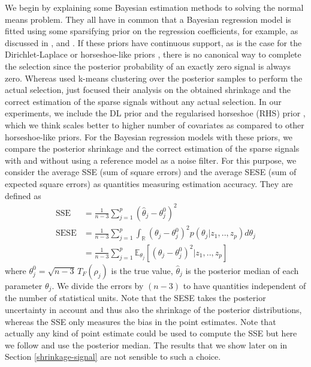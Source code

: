 \documentclass[american,]{article}
\theoremstyle{definition}
\begin{document}
We begin by explaining some Bayesian estimation methods to solving the normal means problem. They all have in common that a Bayesian regression model is fitted using some sparsifying prior on the regression coefficients, for example, as discussed in \cite{paper:dirichlet_laplace}, \cite{bhadra2017horseshoe+} and \cite{johnstone2004needles}. If these priors have continuous support, as is the case for the Dirichlet-Laplace \cite[DL;][]{paper:dirichlet_laplace} or horseshoe-like priors \citep{paper:hs,bhadra2017horseshoe+,paper:rhs}, there is no canonical way to complete the selection since the posterior probability of an exactly zero signal is always zero. Whereas \cite{paper:dirichlet_laplace} used k-means clustering over the posterior samples to perform the actual selection, \cite{bhadra2017horseshoe+} just focused their analysis on the obtained shrinkage and the correct estimation of the sparse signals without any actual selection. In our experiments, we include the DL prior and the regularised horseshoe (RHS) prior \citep{paper:rhs}, which we think scales better to higher number of covariates as compared to other horseshoe-like priors. For the Bayesian regression models with these priors, we compare the posterior shrinkage and the correct estimation of the sparse signals with and without using a reference model as a noise filter. For this purpose, we consider the   average SSE (sum of square errors) and the average SESE (sum of expected square errors) as quantities measuring estimation accuracy. They are defined as
\
\begin{align}
\text{SSE}&=\frac{1}{n-3}\sum_{j=1}^{p}(\hat{\theta}_{j} - \theta^{0}_{j})^{2} \label{eq:SSE} \\
\text{SESE}&=\frac{1}{n-3}\sum_{j=1}^{p}\int_{\mathbb{R}}(\theta_{j}-\theta^{0}_{j})^{2}p(\theta_{j}|z_{1},..,z_{p})d\theta_{j} \\
&=\frac{1}{n-3}\sum_{j=1}^{p}\mathbb{E}_{\theta_{j}}[(\theta_{j}-\theta^{0}_{j})^{2}|z_{1},..,z_{p}] \label{eq:SESE}
\end{align}
where $\theta_{j}^{0}=\sqrt{n-3}\,T_{F}(\rho_{j})$ is the true value, $\hat{\theta}_{j}$ is the posterior median of each parameter $\theta_{j}$. We divide the errors by $(n-3)$ to have quantities independent of the number of statistical units. Note that the SESE takes the posterior uncertainty in account and thus also the shrinkage of the posterior distributions, whereas the SSE only measures the bias in the point estimates. Note that actually any kind of point estimate could be used to compute the SSE but here we follow \cite{paper:dirichlet_laplace} and use the posterior median. The results that we show later on in Section \ref{shrinkage-signal} are not sensible to such a choice. 
\end{document}
